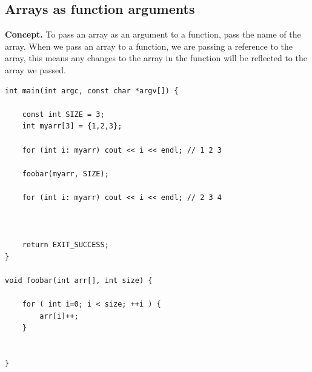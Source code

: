 \documentclass{report}
\begin{document}
    \subsection{Arrays as function arguments}
    \bigbreak \noindent 
    \textbf{Concept.}  To pass an array as an argument to a function, pass the name of the array. When we pass an array to a function, we are passing a reference to the array, this means any changes to the array in the function will be reflected to the array we passed.
    \bigbreak \noindent 
    \sepline
    \begin{verbatim}
int main(int argc, const char *argv[]) {

    const int SIZE = 3;
    int myarr[3] = {1,2,3};

    for (int i: myarr) cout << i << endl; // 1 2 3

    foobar(myarr, SIZE);

    for (int i: myarr) cout << i << endl; // 2 3 4



    return EXIT_SUCCESS;
}

void foobar(int arr[], int size) {

    for ( int i=0; i < size; ++i ) {
        arr[i]++;
    }


}
    \end{verbatim}
    \sepline

    \bigbreak \noindent 

    \pagebreak \bigbreak \noindent 
\end{document}
